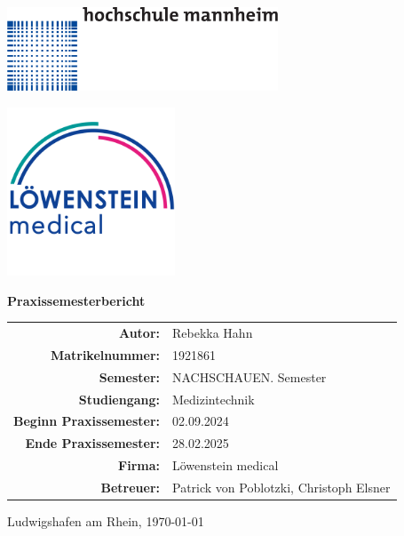 \documentclass[a4paper, 12pt]{article}
\begin{document}
\begin{titlepage}
	\centering

    \begin{minipage}{0.1\textwidth}
        \includegraphics[height=2.5cm]
        {Hochschule_Mannheim_logo.png}
    \end{minipage}
    \hfill 
    \begin{minipage}{0.25\textwidth}
        \includegraphics[height=5cm]
        {loewenstein_logo.png}
    \end{minipage}	

    \vspace{2.5cm} %
	
	{\Huge\bfseries Praxissemesterbericht \par}
    \vspace{2cm} %

    \begin{tabular}{ r  l }
        \textbf{Autor:} & Rebekka Hahn \\
        \textbf{Matrikelnummer:} & 1921861 \\
        \textbf{Semester:} & NACHSCHAUEN. Semester \\
        \textbf{Studiengang:} & Medizintechnik \\
        \textbf{Beginn Praxissemester:} & 02.09.2024 \\
        \textbf{Ende Praxissemester:} & 28.02.2025 \\
        \textbf{Firma:} & Löwenstein medical \\
        \textbf{Betreuer:} & Patrick von Poblotzki, Christoph Elsner \\
    \end{tabular}
    
    \vfill %

    {\large Ludwigshafen am Rhein, \today \par}

\end{titlepage}
\end{document}
